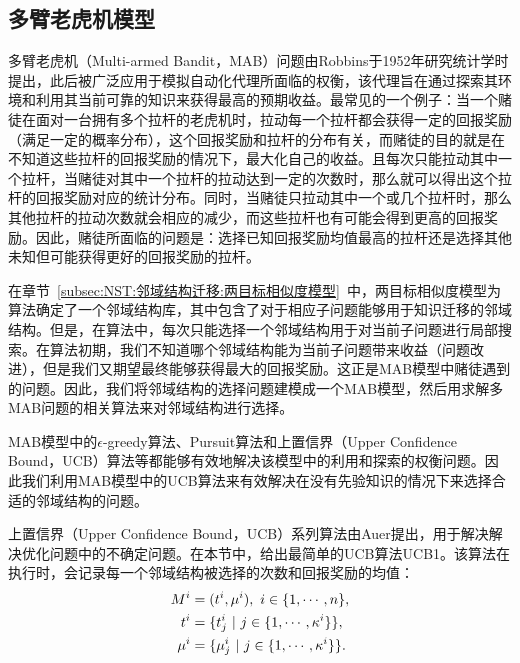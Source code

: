 \subsection{多臂老虎机模型}
\label{subsec:NST:邻域结构迁移:多臂老虎机模型}
多臂老虎机（Multi-armed Bandit，MAB）问题由Robbins于1952年研究统计学时提出\cite{robbins1952some}，此后被广泛应用于模拟自动化代理所面临的权衡，该代理旨在通过探索其环境和利用其当前可靠的知识来获得最高的预期收益\cite{kuleshov2014algorithms}。最常见的一个例子：当一个赌徒在面对一台拥有多个拉杆的老虎机时，拉动每一个拉杆都会获得一定的回报奖励（满足一定的概率分布），这个回报奖励和拉杆的分布有关，而赌徒的目的就是在不知道这些拉杆的回报奖励的情况下，最大化自己的收益。且每次只能拉动其中一个拉杆，当赌徒对其中一个拉杆的拉动达到一定的次数时，那么就可以得出这个拉杆的回报奖励对应的统计分布。同时，当赌徒只拉动其中一个或几个拉杆时，那么其他拉杆的拉动次数就会相应的减少，而这些拉杆也有可能会得到更高的回报奖励。因此，赌徒所面临的问题是：选择已知回报奖励均值最高的拉杆还是选择其他未知但可能获得更好的回报奖励的拉杆\cite{gittins1979bandit}。
\par
在章节~\ref{subsec:NST:邻域结构迁移:两目标相似度模型}~中，两目标相似度模型为算法确定了一个邻域结构库，其中包含了对于相应子问题能够用于知识迁移的邻域结构。但是，在算法中，每次只能选择一个邻域结构用于对当前子问题进行局部搜索。在算法初期，我们不知道哪个邻域结构能为当前子问题带来收益（问题改进），但是我们又期望最终能够获得最大的回报奖励。这正是MAB模型中赌徒遇到的问题。因此，我们将邻域结构的选择问题建模成一个MAB模型，然后用求解多MAB问题的相关算法来对邻域结构进行选择。
\par
MAB模型中的$\epsilon$-greedy算法\cite{cesa1998finite,vermorel2005multi}、Pursuit算法\cite{thathachar1984class,sutton2018reinforcement}和上置信界（Upper Confidence Bound，UCB）算法\cite{auer2002using,garivier2008upper,slivkins2011contextual}等都能够有效地解决该模型中的利用和探索的权衡问题。因此我们利用MAB模型中的UCB算法来有效解决在没有先验知识的情况下来选择合适的邻域结构的问题。
\par
上置信界（Upper Confidence Bound，UCB）系列算法由Auer提出\cite{auer2002using}，用于解决解决优化问题中的不确定问题。在本节中，给出最简单的UCB算法UCB1。该算法在执行时，会记录每一个邻域结构被选择的次数和回报奖励的均值：
\vspace{-1em}
\begin{align}
    \label{eq:MAB Model}
    M^i &= (t^i, \mu^i), \ i \in \{ 1, \cdots, n \}, \\
    t^i &= \{t^i_j \ | \ j \in \{1,\cdots,\kappa^i\} \}, \notag \\
    \mu^i &= \{\mu^i_j \ | \ j \in \{1,\cdots,\kappa^i\} \}. \notag
\end{align}

